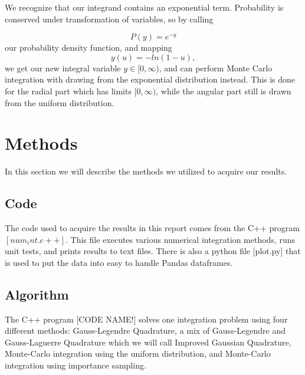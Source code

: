 \documentclass{emulateapj}
\begin{document}
We recognize that our integrand contains an exponential term. Probability is conserved under transformation of variables, so by calling

\begin{equation}
    P(y) = e^{-y}
\end{equation}
our probability density function, and mapping
\begin{equation}
    y(u) = -ln\left(1-u\right),
\end{equation}
we get our new integral variable $y\in [0,\infty)$, and can perform Monte Carlo integration with drawing from the exponential distribution instead. This is done for the radial part which has limits $[0,\infty)$, while the angular part still is drawn from the uniform distribution.

\section{Methods}
\label{sec:methods}
In this section we will describe the methods we utilized to acquire our results.
\subsection{Code}
The code used to acquire the results in this report comes from the C++ program $[num_int.c++]$. This file executes various numerical integration methods, runs unit tests, and prints results to text files. There is also a python file [plot.py] that is used to put the data into easy to handle Pandas dataframes.

\subsection{Algorithm}
The C++ program [CODE NAME!] solves one integration problem using four different methods: Gauss-Legendre Quadrature, a mix of Gauss-Legendre and Gauss-Laguerre Quadrature which we will call Improved Gaussian Quadrature, Monte-Carlo integration using the uniform distribution, and Monte-Carlo integration using importance sampling.
\end{document}
